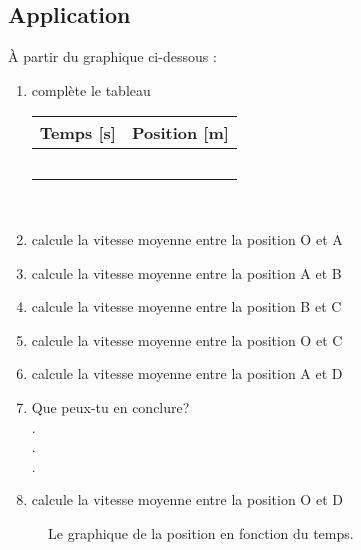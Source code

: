 \subsection{Application}
À partir du graphique ci-dessous :
\begin{enumerate}
    \item complète le tableau \\
          \renewcommand{\arraystretch}{1.5}
          \begin{tabularx}{.8\linewidth}{|X|X|}
              \hline
              Temps [s] & Position [m] \\
              \hline
                        &              \\
              \hline
                        &              \\
              \hline
                        &              \\
              \hline
                        &              \\
              \hline
                        &              \\
              \hline
          \end{tabularx}
          \renewcommand{\arraystretch}{1}
          \\
    \item calcule la vitesse moyenne entre la position O et A \dotfill
    \item calcule la vitesse moyenne entre la position A et B \dotfill
    \item calcule la vitesse moyenne entre la position B et C \dotfill
    \item calcule la vitesse moyenne entre la position O et C \dotfill
    \item calcule la vitesse moyenne entre la position A et D \dotfill
    \item Que peux-tu en conclure? \dotfill \\
          . \dotfill \\
          . \dotfill \\
          . \dotfill
    \item calcule la vitesse moyenne entre la position O et D \dotfill
\end{enumerate}

\newpage
\begin{figure}[!ht]
    \centering
    \resizebox{\linewidth}{!}{}
    \caption{Le graphique de la position en fonction du temps.}
    \label{exercice_deplacement_1}
\end{figure}


